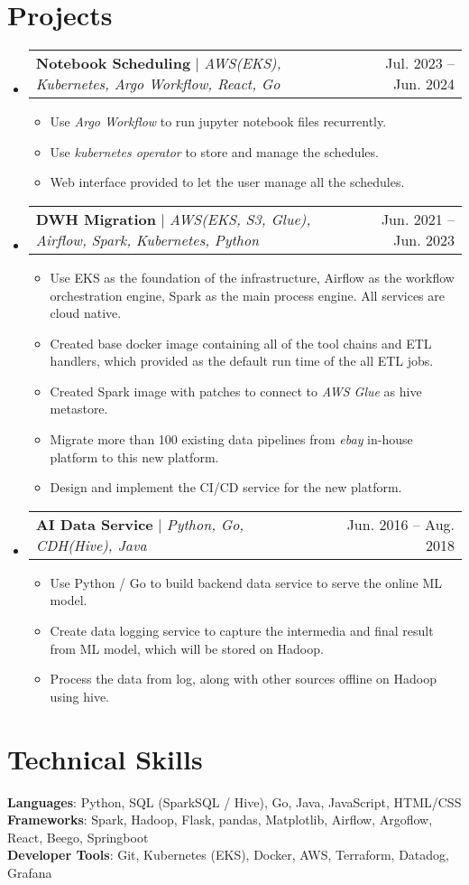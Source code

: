 \documentclass[a4paper,11pt]{article}
\makeatletter
\newcommand{\resumeItem}[1]{
  \item\small{
    {#1 \vspace{-2pt}}
  }
}
\newcommand{\resumeProjectHeading}[2]{
    \item
    \begin{tabular*}{0.97\textwidth}{l@{\extracolsep{\fill}}r}
      \small#1 & #2 \\
    \end{tabular*}\vspace{-7pt}
}
\newcommand{\resumeSubHeadingListStart}{\begin{itemize}[leftmargin=0.15in, label={}]}
\newcommand{\resumeSubHeadingListEnd}{\end{itemize}}
\newcommand{\resumeItemListStart}{\begin{itemize}}
\newcommand{\resumeItemListEnd}{\end{itemize}\vspace{-5pt}}
\makeatother
\begin{document}
\section{Projects}
    \resumeSubHeadingListStart
      \resumeProjectHeading
          {\textbf{Notebook Scheduling} $|$ \emph{AWS(EKS), Kubernetes, Argo Workflow, React, Go}}{Jul. 2023 -- Jun. 2024}
          \resumeItemListStart
            \resumeItem{Use \emph{Argo Workflow} to run jupyter notebook files recurrently.}
            \resumeItem{Use \emph{kubernetes operator} to store and manage the schedules.}
            \resumeItem{Web interface provided to let the user manage all the schedules.}
          \resumeItemListEnd
      \resumeProjectHeading
          {\textbf{DWH Migration} $|$ \emph{AWS(EKS, S3, Glue), Airflow, Spark, Kubernetes, Python}}{Jun. 2021 -- Jun. 2023}
          \resumeItemListStart
            \resumeItem{Use EKS as the foundation of the infrastructure, Airflow as the workflow orchestration engine, Spark as the main process engine. All services are cloud native.}
            \resumeItem{Created base docker image containing all of the tool chains and ETL handlers, which provided as the default run time of the all ETL jobs.}
            \resumeItem{Created Spark image with patches to connect to \emph{AWS Glue} as hive metastore.}
            \resumeItem{Migrate more than 100 existing data pipelines from \emph{ebay} in-house platform to this new platform.} 
            \resumeItem{Design and implement the CI/CD service for the new platform.}
          \resumeItemListEnd
      \resumeProjectHeading
          {\textbf{AI Data Service} $|$ \emph{Python, Go, CDH(Hive), Java}}{Jun. 2016 -- Aug. 2018}
          \resumeItemListStart
            \resumeItem{Use Python / Go to build backend data service to serve the online ML model.}
            \resumeItem{Create data logging service to capture the intermedia and final result from ML model, which will be stored on Hadoop.}
            \resumeItem{Process the data from log, along with other sources offline on Hadoop using hive.}
          \resumeItemListEnd
    \resumeSubHeadingListEnd


%
\section{Technical Skills}
 \begin{itemize}[leftmargin=0.15in, label={}]
    \small{\item{
     \textbf{Languages}{: Python, SQL (SparkSQL / Hive), Go, Java, JavaScript, HTML/CSS} \\
     \textbf{Frameworks}{: Spark, Hadoop, Flask, pandas, Matplotlib, Airflow, Argoflow, React, Beego, Springboot } \\
     \textbf{Developer Tools}{: Git, Kubernetes (EKS), Docker, AWS, Terraform, Datadog, Grafana} \\
    }}
 \end{itemize}


\end{document}
